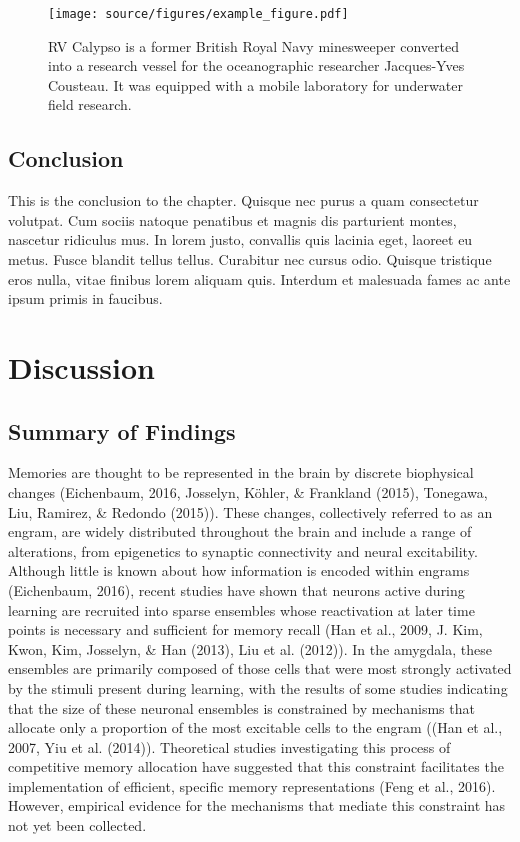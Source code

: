 \documentclass[12pt,a4paper,]{report}
\begin{document}
\begin{figure}[htbp]
\centering
\texttt{[image: source/figures/example\_figure.pdf]}
\caption{RV Calypso is a former British Royal Navy minesweeper converted
into a research vessel for the oceanographic researcher Jacques-Yves
Cousteau. It was equipped with a mobile laboratory for underwater field
research. \label{ref_a_figure}}
\end{figure}

\section{Conclusion}\label{conclusion-2}

This is the conclusion to the chapter. Quisque nec purus a quam
consectetur volutpat. Cum sociis natoque penatibus et magnis dis
parturient montes, nascetur ridiculus mus. In lorem justo, convallis
quis lacinia eget, laoreet eu metus. Fusce blandit tellus tellus.
Curabitur nec cursus odio. Quisque tristique eros nulla, vitae finibus
lorem aliquam quis. Interdum et malesuada fames ac ante ipsum primis in
faucibus.

\chapter{Discussion}\label{discussion-2}

\section{Summary of Findings}\label{summary-of-findings}

Memories are thought to be represented in the brain by discrete
biophysical changes (Eichenbaum, 2016, Josselyn, Köhler, \& Frankland
(2015), Tonegawa, Liu, Ramirez, \& Redondo (2015)). These changes,
collectively referred to as an engram, are widely distributed throughout
the brain and include a range of alterations, from epigenetics to
synaptic connectivity and neural excitability. Although little is known
about how information is encoded within engrams (Eichenbaum, 2016),
recent studies have shown that neurons active during learning are
recruited into sparse ensembles whose reactivation at later time points
is necessary and sufficient for memory recall (Han et al., 2009, J. Kim,
Kwon, Kim, Josselyn, \& Han (2013), Liu et al. (2012)). In the amygdala,
these ensembles are primarily composed of those cells that were most
strongly activated by the stimuli present during learning, with the
results of some studies indicating that the size of these neuronal
ensembles is constrained by mechanisms that allocate only a proportion
of the most excitable cells to the engram ((Han et al., 2007, Yiu et al.
(2014)). Theoretical studies investigating this process of competitive
memory allocation have suggested that this constraint facilitates the
implementation of efficient, specific memory representations (Feng et
al., 2016). However, empirical evidence for the mechanisms that mediate
this constraint has not yet been collected.
\end{document}
